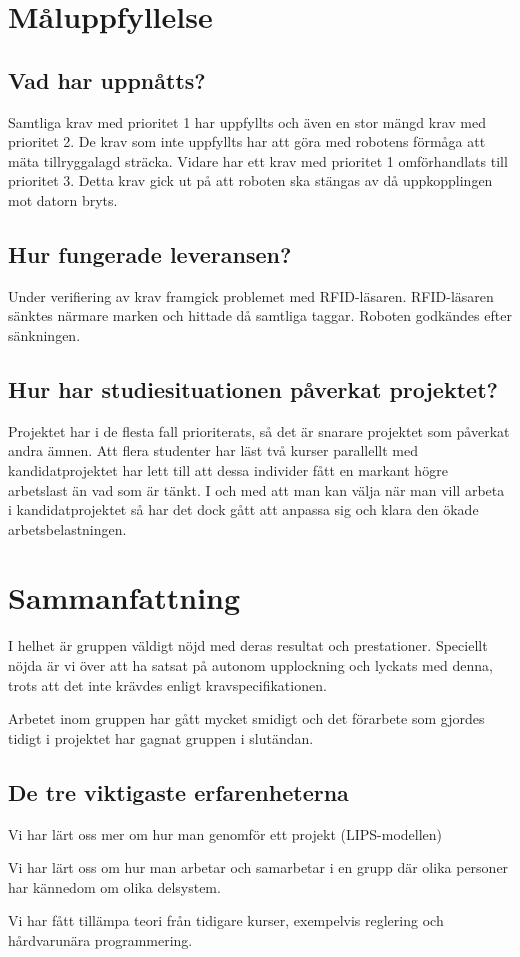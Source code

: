 \documentclass[a4paper,12pt]{article}
\begin{document}
\section{Måluppfyllelse}
\subsection{Vad har uppnåtts?}
Samtliga krav med prioritet 1 har uppfyllts och även en stor mängd krav med prioritet 2. De krav som inte uppfyllts har att göra med robotens förmåga att mäta tillryggalagd sträcka. Vidare har ett krav med prioritet 1 omförhandlats till prioritet 3. Detta krav gick ut på att roboten ska stängas av då uppkopplingen mot datorn bryts.
\subsection{Hur fungerade leveransen?}
Under verifiering av krav framgick problemet med RFID-läsaren. RFID-läsaren sänktes närmare marken och hittade då samtliga taggar. Roboten godkändes efter sänkningen.
\subsection{Hur har studiesituationen påverkat projektet?}
Projektet har i de flesta fall prioriterats, så det är snarare projektet som påverkat andra ämnen. Att flera studenter har läst två kurser parallellt med kandidatprojektet har lett till att dessa individer fått en markant högre arbetslast än vad som är tänkt. I och med att man kan välja när man vill arbeta i kandidatprojektet så har det dock gått att anpassa sig och klara den ökade arbetsbelastningen.

\section{Sammanfattning}
I helhet är gruppen väldigt nöjd med deras resultat och prestationer. Speciellt nöjda är vi över att ha satsat på autonom upplockning och lyckats med denna, trots att det inte krävdes enligt kravspecifikationen. 

Arbetet inom gruppen har gått mycket smidigt och det förarbete som gjordes tidigt i projektet har gagnat gruppen i slutändan.
\subsection{De tre viktigaste erfarenheterna}
\begin{packed_itemize}
\item Vi har lärt oss mer om hur man genomför ett projekt (LIPS-modellen)
\item Vi har lärt oss om hur man arbetar och samarbetar i en grupp där olika personer har kännedom om olika delsystem.
\item Vi har fått tillämpa teori från tidigare kurser, exempelvis reglering och hårdvarunära programmering.
\end{packed_itemize}
\end{document}
